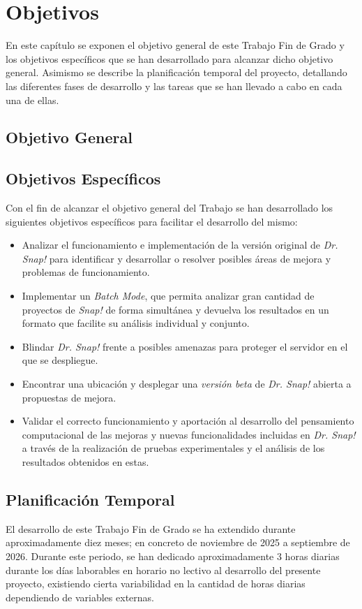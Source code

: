 \chapter{Objetivos}
\label{cap:obj} %
En este capítulo se exponen el objetivo general de este Trabajo Fin de Grado y los objetivos específicos que se han desarrollado para alcanzar dicho objetivo general. Asimismo se describe la planificación temporal del proyecto, detallando las diferentes fases de desarrollo y las tareas que se han llevado a cabo en cada una de ellas.


\section{Objetivo General}
\label{sec:objgen}

\section{Objetivos Específicos}
\label{sec:objesp}
Con el fin de alcanzar el objetivo general del Trabajo se han desarrollado los siguientes objetivos específicos para facilitar el desarrollo del mismo:
\begin{itemize}
    \item Analizar el funcionamiento e implementación de la versión original de \textit{Dr. Snap!} para identificar y desarrollar o resolver posibles áreas de mejora y problemas de funcionamiento.
    \item Implementar un \textit{Batch Mode}, que permita analizar gran cantidad de proyectos de \textit{Snap!} de forma simultánea y devuelva los resultados en un formato que facilite su análisis individual y conjunto.
    \item Blindar \textit{Dr. Snap!} frente a posibles amenazas para proteger el servidor en el que se despliegue.
    \item Encontrar una ubicación y desplegar una \textit{versión beta} de \textit{Dr. Snap!} abierta a propuestas de mejora.
    \item Validar el correcto funcionamiento y aportación al desarrollo del pensamiento computacional de las mejoras y nuevas funcionalidades incluidas en \textit{Dr. Snap!} a través de la realización de pruebas experimentales y el análisis de los resultados obtenidos en estas.
\end{itemize}

\section{Planificación Temporal}
\label{sec:plan}
El desarrollo de este Trabajo Fin de Grado se ha extendido durante aproximadamente diez meses; en concreto de noviembre de 2025 a septiembre de 2026. Durante este periodo, se han dedicado aproximadamente 3 horas diarias durante los días laborables en horario no lectivo al desarrollo del presente proyecto, existiendo cierta variabilidad en la cantidad de horas diarias dependiendo de variables externas.

